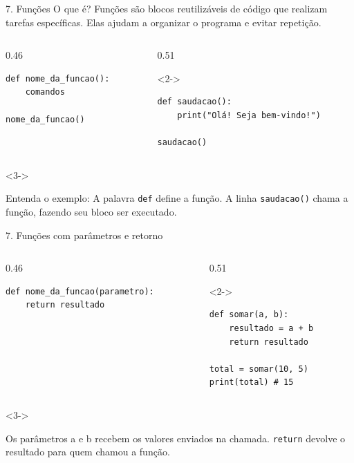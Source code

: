 \begin{frame}[fragile,t]{7. Funções}
O que é? Funções são blocos reutilizáveis de código que realizam tarefas específicas. Elas ajudam a organizar o programa e evitar repetição.\par
\begin{columns}[T,onlytextwidth]
\begin{column}{0.46\textwidth}
\begin{lstlisting}
def nome_da_funcao():
    comandos

nome_da_funcao()
\end{lstlisting}
\end{column}
\begin{column}{0.51\textwidth}
\begin{visibleenv}<2->
\begin{lstlisting}
def saudacao():
    print("Olá! Seja bem-vindo!")

saudacao()
\end{lstlisting}
\end{visibleenv}
\end{column}
\end{columns}
\begin{visibleenv}<3->
\begin{EMASCnote}
Entenda o exemplo: A palavra \texttt{def} define a função. A linha \texttt{saudacao()} chama a função, fazendo seu bloco ser executado.
\end{EMASCnote}
\end{visibleenv}
\end{frame}

\begin{frame}[fragile,t]{7. Funções com parâmetros e retorno}
\begin{columns}[T,onlytextwidth]
\begin{column}{0.46\textwidth}
\begin{lstlisting}
def nome_da_funcao(parametro):
    return resultado
\end{lstlisting}
\end{column}
\begin{column}{0.51\textwidth}
\begin{visibleenv}<2->
\begin{lstlisting}
def somar(a, b):
    resultado = a + b
    return resultado

total = somar(10, 5)
print(total) # 15
\end{lstlisting}
\end{visibleenv}
\end{column}
\end{columns}
\begin{visibleenv}<3->
\begin{EMASCnote}
Os parâmetros a e b recebem os valores enviados na chamada. \texttt{return} devolve o resultado para quem chamou a função.
\end{EMASCnote}
\end{visibleenv}
\end{frame}
